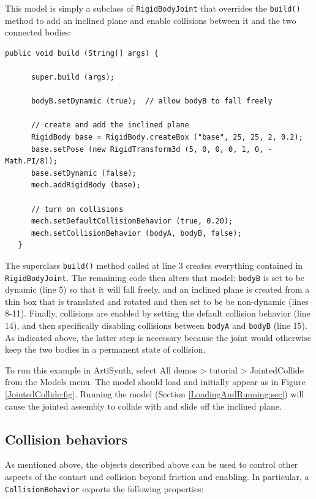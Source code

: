 This model is simply a subclass of {\tt RigidBodyJoint} that
overrides the {\tt build()} method 
to add an inclined plane and enable collisions between it and
the two connected bodies:
%
\lstset{numbers=left}
\begin{lstlisting}[]
   public void build (String[] args) {

      super.build (args);

      bodyB.setDynamic (true);  // allow bodyB to fall freely

      // create and add the inclined plane
      RigidBody base = RigidBody.createBox ("base", 25, 25, 2, 0.2);
      base.setPose (new RigidTransform3d (5, 0, 0, 0, 1, 0, -Math.PI/8));
      base.setDynamic (false);
      mech.addRigidBody (base);

      // turn on collisions
      mech.setDefaultCollisionBehavior (true, 0.20);
      mech.setCollisionBehavior (bodyA, bodyB, false);
   }
\end{lstlisting}
\lstset{numbers=none}

The superclass {\tt build()} method called at line 3 creates
everything contained in {\tt RigidBodyJoint}. The remaining code then
alters that model: {\tt bodyB} is set to be dynamic (line 5) so that
it will fall freely, and an inclined plane is created from a thin box
that is translated and rotated and then set to be be non-dynamic
(lines 8-11).  Finally, collisions are enabled by setting the default
collision behavior (line 14), and then specifically disabling
collisions between {\tt bodyA} and {\tt bodyB} (line 15). As indicated
above, the latter step is necessary because the joint would otherwise
keep the two bodies in a permanent state of collision.

To run this example in ArtiSynth, select {\sf All demos > tutorial >
JointedCollide} from the {\sf Models} menu. The model should load and
initially appear as in Figure \ref{JointedCollide:fig}.  Running
the model (Section \ref{LoadingAndRunning:sec}) will
cause the jointed assembly to collide with and slide off the inclined
plane.

\subsection{Collision behaviors}
\label{collisionBehavior:sec}

As mentioned above, the
 objects
described above can be used to control other aspects of the contact
and collision beyond friction and enabling. In particular, a {\tt
CollisionBehavior} exports the following properties:


